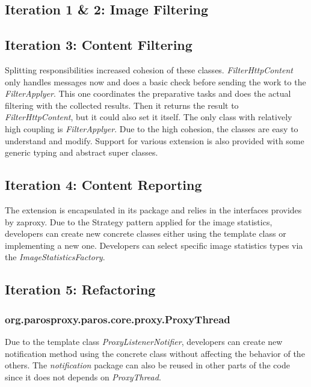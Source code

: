 \subsection{Iteration 1 \& 2: Image Filtering}
\subsection{Iteration 3: Content Filtering}
Splitting responsibilities increased cohesion of these classes. \textit{FilterHttpContent} only handles messages now and does a basic check before sending the work to the \textit{FilterApplyer}. This one coordinates the preparative tasks and does the actual filtering with the collected results. Then it returns the result to \textit{FilterHttpContent}, but it could also set it itself.
The only class with relatively high coupling is \textit{FilterApplyer}.
Due to the high cohesion, the classes are easy to understand and modify. Support for various extension is also provided with some generic typing and abstract super classes.
\subsection{Iteration 4: Content Reporting}
The extension is encapsulated in its package and relies in the interfaces provides by zaproxy. Due to the Strategy pattern applied for the image statistics, developers can create new concrete classes either using the template class or implementing a new one. Developers can select specific image statistics types via the \textit{ImageStatisticsFactory}.

\subsection{Iteration 5: Refactoring}

\subsubsection{org.parosproxy.paros.core.proxy.ProxyThread}

Due to the template class \textit{ProxyListenerNotifier}, developers can create new notification method using the concrete class without affecting the behavior of the others. The \textit{notification} package can also be reused in other parts of the code since it does not depends on \textit{ProxyThread}. 
